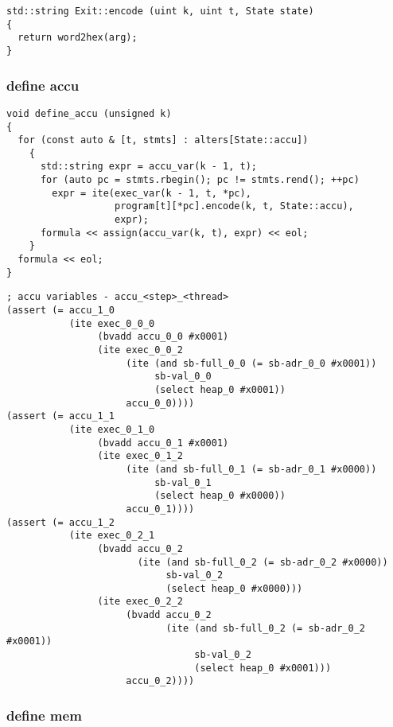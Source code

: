\begin{lstlisting}[style=c++]
std::string Exit::encode (uint k, uint t, State state)
{
  return word2hex(arg);
}
\end{lstlisting}

\subsubsection{define accu}

\begin{lstlisting}[style=c++]
void define_accu (unsigned k)
{
  for (const auto & [t, stmts] : alters[State::accu])
    {
      std::string expr = accu_var(k - 1, t);
      for (auto pc = stmts.rbegin(); pc != stmts.rend(); ++pc)
        expr = ite(exec_var(k - 1, t, *pc),
                   program[t][*pc].encode(k, t, State::accu),
                   expr);
      formula << assign(accu_var(k, t), expr) << eol;
    }
  formula << eol;
}
\end{lstlisting}

\begin{lstlisting}[language=SMTLib]
; accu variables - accu_<step>_<thread>
(assert (= accu_1_0
           (ite exec_0_0_0
                (bvadd accu_0_0 #x0001)
                (ite exec_0_0_2
                     (ite (and sb-full_0_0 (= sb-adr_0_0 #x0001))
                          sb-val_0_0
                          (select heap_0 #x0001))
                     accu_0_0))))
(assert (= accu_1_1
           (ite exec_0_1_0
                (bvadd accu_0_1 #x0001)
                (ite exec_0_1_2
                     (ite (and sb-full_0_1 (= sb-adr_0_1 #x0000))
                          sb-val_0_1
                          (select heap_0 #x0000))
                     accu_0_1))))
(assert (= accu_1_2
           (ite exec_0_2_1
                (bvadd accu_0_2
                       (ite (and sb-full_0_2 (= sb-adr_0_2 #x0000))
                            sb-val_0_2
                            (select heap_0 #x0000)))
                (ite exec_0_2_2
                     (bvadd accu_0_2
                            (ite (and sb-full_0_2 (= sb-adr_0_2 #x0001))
                                 sb-val_0_2
                                 (select heap_0 #x0001)))
                     accu_0_2))))
\end{lstlisting}

\subsubsection{define mem}

